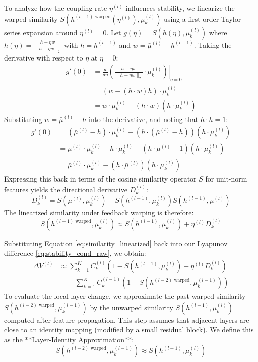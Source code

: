 To analyze how the coupling rate $\eta^{(l)}$ influences stability, we linearize the warped similarity $S(h^{(l-1) \text{ warped}}(\eta^{(l)}), \mu_k^{(l)})$ using a first-order Taylor series expansion around $\eta^{(l)} = 0$. Let $g(\eta) = S(h(\eta), \mu_k^{(l)})$ where $h(\eta) = \frac{h + \eta w}{\|h + \eta w\|_2}$ with $h = h^{(l-1)}$ and $w = \bar{\mu}^{(l)} - h^{(l-1)}$. Taking the derivative with respect to $\eta$ at $\eta = 0$:
\begin{align*}
g'(0) &= \left. \frac{d}{d\eta} \left( \frac{h + \eta w}{\|h + \eta w\|_2} \cdot \mu_k^{(l)} \right) \right|_{\eta=0} \\
&= \left( w - (h \cdot w) h \right) \cdot \mu_k^{(l)} \\
&= w \cdot \mu_k^{(l)} - (h \cdot w) (h \cdot \mu_k^{(l)})
\end{align*}
Substituting $w = \bar{\mu}^{(l)} - h$ into the derivative, and noting that $h \cdot h = 1$:
\begin{align*}
g'(0) &= (\bar{\mu}^{(l)} - h) \cdot \mu_k^{(l)} - \left( h \cdot (\bar{\mu}^{(l)} - h) \right) (h \cdot \mu_k^{(l)}) \\
&= \bar{\mu}^{(l)} \cdot \mu_k^{(l)} - h \cdot \mu_k^{(l)} - \left( h \cdot \bar{\mu}^{(l)} - 1 \right) (h \cdot \mu_k^{(l)}) \\
&= \bar{\mu}^{(l)} \cdot \mu_k^{(l)} - (h \cdot \bar{\mu}^{(l)}) (h \cdot \mu_k^{(l)})
\end{align*}
Expressing this back in terms of the cosine similarity operator $S$ for unit-norm features yields the directional derivative $D_k^{(l)}$:
\begin{equation}
D_k^{(l)} = S(\bar{\mu}^{(l)}, \mu_k^{(l)}) - S(h^{(l-1)}, \mu_k^{(l)}) S(h^{(l-1)}, \bar{\mu}^{(l)})
\label{eq:directional_derivative}
\end{equation}
The linearized similarity under feedback warping is therefore:
\begin{equation}
S(h^{(l-1) \text{ warped}}, \mu_k^{(l)}) \approx S(h^{(l-1)}, \mu_k^{(l)}) + \eta^{(l)} D_k^{(l)}
\label{eq:similarity_linearized}
\end{equation}

Substituting Equation \eqref{eq:similarity_linearized} back into our Lyapunov difference \eqref{eq:stability_cond_raw}, we obtain:
\begin{align*}
\Delta V^{(l)} &\approx \sum_{k=1}^K C_k^{(l)} \left( 1 - S(h^{(l-1)}, \mu_k^{(l)}) - \eta^{(l)} D_k^{(l)} \right) \\
&\quad - \sum_{k=1}^K C_k^{(l-1)} \left( 1 - S(h^{(l-2) \text{ warped}}, \mu_k^{(l-1)}) \right)
\end{align*}
To evaluate the local layer change, we approximate the past warped similarity $S(h^{(l-2) \text{ warped}}, \mu_k^{(l-1)})$ by the unwarped similarity $S(h^{(l-1)}, \mu_k^{(l)})$ computed after feature propagation. This step assumes that adjacent layers are close to an identity mapping (modified by a small residual block). We define this as the **Layer-Identity Approximation**:
\begin{equation}
S(h^{(l-2) \text{ warped}}, \mu_k^{(l-1)}) \approx S(h^{(l-1)}, \mu_k^{(l)})
\label{eq:layer_identity_approx}
\end{equation}

